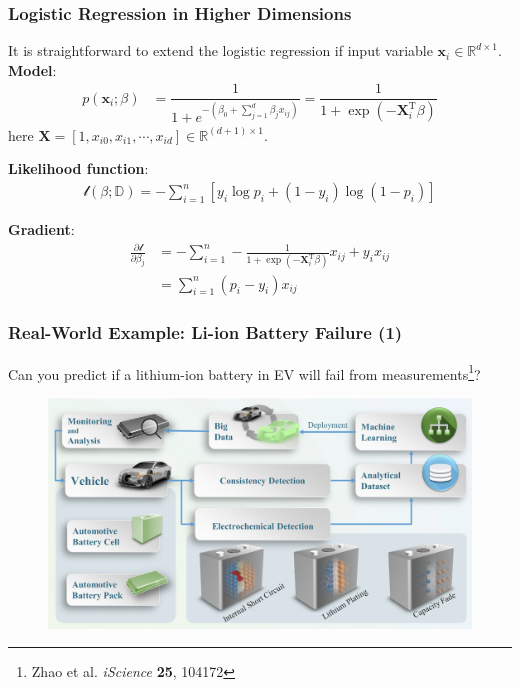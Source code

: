 \documentclass[10pt,aspectratio=169]{beamer}
\begin{document}
      \begin{frame}
        \frametitle{Logistic Regression in Higher Dimensions}

        It is straightforward to extend the logistic regression if
        input variable $\mathbf{x}_{i} \in \mathbb{R}^{d\times{}1}$.  \vfill
        \textbf{Model}:
        \begin{align*}
          p(\mathbf{x}_{i}; \beta) &= \dfrac{1}{1 + e^{-(\beta_{0} + \sum_{j=1}^{d} \beta_{j} x_{ij})}} = \dfrac{1}{1 + \exp(- \mathbf{X}_{i}^{\mathrm{T}} \beta)}
        \end{align*}
        here $\mathbf{X} = \left[1, x_{i0}, x_{i1}, \cdots, x_{id}\right] \in \mathbb{R}^{(d+1)\times{}1}$.

        \vfill \textbf{Likelihood function}:
        \begin{align*}
          \mathscr{l}(\beta; \mathbb{D}) = -\sum_{i=1}^{n}\left[y_{i} \log p_{i} + (1 - y_{i})\log (1 - p_{i}) \right] 
        \end{align*}

        \vfill \textbf{Gradient}:
        \begin{align*}
          \frac{\partial \mathscr{l}}{\partial \beta_{j}}
          &= -\sum_{i=1}^{n} -\frac{1}{1 + \exp(-\mathbf{X}_{i}^{\mathrm{T}} \beta)} x_{ij} + y_{i}x_{ij} \\
          &= \sum_{i=1}^{n} (p_{i} - y_{i})x_{ij}
        \end{align*}
        
      \end{frame}

      \begin{frame}
        \frametitle{Real-World Example: Li-ion Battery Failure (1)}

        Can you predict if a lithium-ion battery in EV will fail from
        measurements\let\thefootnote\relax\footnote{{\scriptsize Zhao
            et al. \textit{iScience} \textbf{25}, 104172}}?

        \begin{figure}[t]
          \includegraphics[width=0.9\linewidth]{images/battery_1.png}
        \end{figure}

      \end{frame}
\end{document}
